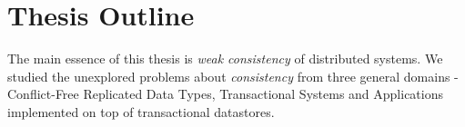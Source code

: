 %

\section{Thesis Outline}

The main essence of this thesis is \emph{weak consistency} of distributed systems. We studied the unexplored problems about \emph{consistency} from three general domains - Conflict-Free Replicated Data Types, Transactional Systems and Applications implemented on top of transactional datastores.


